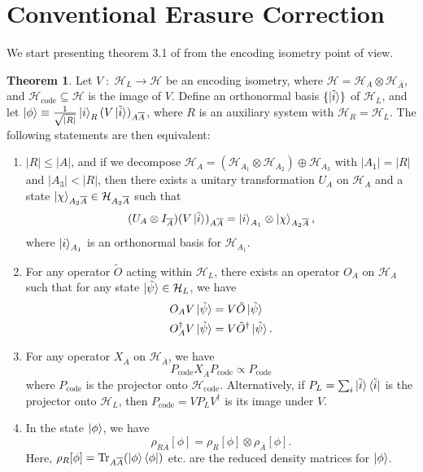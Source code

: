 \documentclass[12pt,a4paper]{report}
\numberwithin{equation}{section}
\newcommand{\ketbra}[2]{\ket{#1}\bra{#2}}
\newcommand{\ketbras}[1]{\ketbra{#1}{#1}}
\newcommand{\Pc}{P_{\text{code}}}
\newcommand{\Hcode}{\mathcal{H}_{\text{code}}}
\newcommand{\ol}[1]{\overline{#1}}
\newcommand{\tr}{\text{Tr}}
\theoremstyle{definition}
\theoremstyle{theorem}
\newtheorem{theorem}{Theorem}[section]
\theoremstyle{theorem}
\theoremstyle{example}
\theoremstyle{definition}
\begin{document}
\section{Conventional Erasure Correction}
We start presenting theorem 3.1 of \cite{Harlow} from the encoding isometry point of view.
\begin{theorem}\label{t1}
	Let $V\;:\;\mathcal{H}_{L}\to\mathcal{H}$ be an encoding isometry, where $\mathcal{H}=\mathcal{H}_{A}\otimes\mathcal{H}_{\ol{A}}$, and $\Hcode\subseteq\mathcal{H}$ is the image of $V$. Define an orthonormal basis $\{\ket{\tilde{i}}\}$ of $\mathcal{H}_{L}$, and let $\ket{\phi}\equiv\frac{1}{\sqrt{|R|}}\ket{i}_{R}(V\ket{\tilde{i}})_{A\ol{A}}$, where $R$ is an auxiliary system with $\mathcal{H}_{R}=\mathcal{H}_{L}$. The following statements are then equivalent:
	\begin{enumerate}
		\item $|R|\leq|A|$, and if we decompose $\mathcal{H}_{A}=(\mathcal{H}_{A_{1}}\otimes\mathcal{H}_{A_{2}})\oplus\mathcal{H}_{A_{3}}$ with $|A_{1}|=|R|$ and $|A_{3}|<|R|$, then there exists a unitary transformation $U_{A}$ on $\mathcal{H}_{A}$ and a state $\ket{\chi}_{A_{2}\ol{A}}\in\mathcal{H}_{A_{2}\ol{A}}$ such that 
		\begin{equation}\label{C1}
			(U_{A}\otimes I_{\ol{A}})(V\ket{\tilde{i}})_{A\ol{A}}=\ket{i}_{A_{1}}\otimes\ket{\chi}_{A_{2}\ol{A}},
		\end{equation}
		where $\ket{i}_{A_{1}}$ is an orthonormal basis for $\mathcal{H}_{A_{1}}$.
		\item For any operator $\tilde{O}$ acting within $\mathcal{H}_{L}$, there exists an operator $O_{A}$ on $\mathcal{H}_{A}$ such that for any state $\ket{\tilde{\psi}}\in\mathcal{H}_{L}$, we have
		\begin{equation}\label{C2}
			\begin{aligned}
				O_{A}V\ket{\tilde{\psi}}&=V\tilde{O}\ket{\tilde{\psi}}\\
				O_{A}^{\dagger}V\ket{\tilde{\psi}}&=V\tilde{O}^{\dagger}\ket{\tilde{\psi}}.
			\end{aligned}
		\end{equation}
		\item For any operator $X_{\ol{A}}$ on $\mathcal{H}_{\ol{A}}$, we have
		\begin{equation}\label{C3}
			\Pc X_{\ol{A}}\Pc\propto\Pc
		\end{equation}
		where $\Pc$ is the projector onto $\Hcode$. Alternatively, if $P_{L}=\sum_{i}\ketbras{\tilde{i}}$ is the projector onto $\mathcal{H}_{L}$, then $\Pc=VP_{L}V^{\dagger}$ is its image under $V$.
		\item In the state $\ket{\phi}$, we have
		\begin{equation}\label{C4}
			\rho_{R\ol{A}}[\phi]=\rho_{R}[\phi]\otimes\rho_{\ol{A}}[\phi].
		\end{equation}
		Here, $\rho_{R}[\phi]=\tr_{A\ol{A}}(\ketbras{\phi})$ etc. are the reduced density matrices for $\ket{\phi}$.
	\end{enumerate}
\end{theorem}
\end{document}
